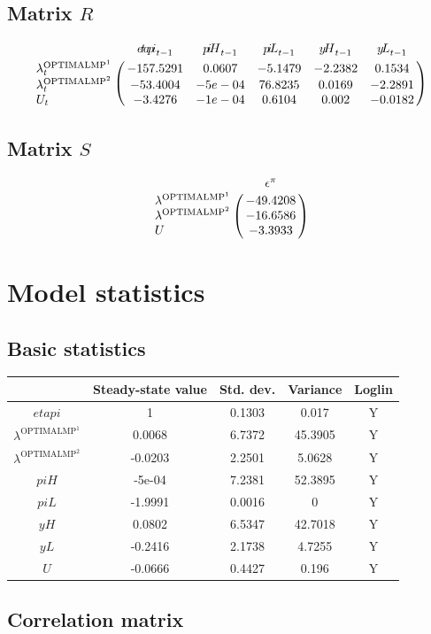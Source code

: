 \subsection*{Matrix $R$}

$$\bordermatrix{
~ & {e\!t\!a\!p\!i}_{t-1} & {p\!i\!H}_{t-1} & {p\!i\!L}_{t-1} & {y\!H}_{t-1} & {y\!L}_{t-1} \cr
\lambda^{\mathrm{OPTIMALMP}^{\mathrm{1}}}_{t} & -157.5291 & 0.0607 & -5.1479 & -2.2382 & 0.1534 \cr
\lambda^{\mathrm{OPTIMALMP}^{\mathrm{2}}}_{t} & -53.4004 & -5e-04 & 76.8235 & 0.0169 & -2.2891 \cr
U_{t} & -3.4276 & -1e-04 & 0.6104 & 0.002 & -0.0182 \cr
}$$

\subsection*{Matrix $S$}

$$\bordermatrix{
~ & \epsilon^{\pi} \cr
\lambda^{\mathrm{OPTIMALMP}^{\mathrm{1}}} & -49.4208 \cr
\lambda^{\mathrm{OPTIMALMP}^{\mathrm{2}}} & -16.6586 \cr
U & -3.3933 \cr
}$$


\section{Model statistics}

\subsection{Basic statistics}

\begin{tabular}{c|c|c|c|c|}
  & Steady-state value & Std. dev. & Variance & Loglin\\
\hline
${e\!t\!a\!p\!i}$ & 1 & 0.1303 & 0.017 & Y    \\
$\lambda^{\mathrm{OPTIMALMP}^{\mathrm{1}}}$ & 0.0068 & 6.7372 & 45.3905 & Y    \\
$\lambda^{\mathrm{OPTIMALMP}^{\mathrm{2}}}$ & -0.0203 & 2.2501 & 5.0628 & Y    \\
${p\!i\!H}$ & -5e-04 & 7.2381 & 52.3895 & Y    \\
${p\!i\!L}$ & -1.9991 & 0.0016 & 0 & Y    \\
${y\!H}$ & 0.0802 & 6.5347 & 42.7018 & Y    \\
${y\!L}$ & -0.2416 & 2.1738 & 4.7255 & Y    \\
$U$ & -0.0666 & 0.4427 & 0.196 & Y    \\
\hline
\end{tabular}


\subsection{Correlation matrix}


